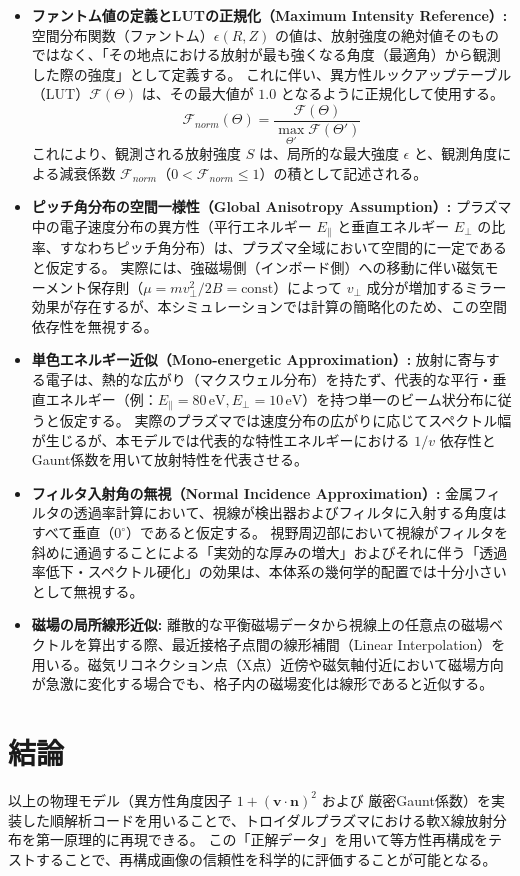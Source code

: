 \documentclass[a4paper,11pt]{bxjsarticle} %
\begin{document}
\begin{itemize}
    \item \textbf{ファントム値の定義とLUTの正規化（Maximum Intensity Reference）:}
    空間分布関数（ファントム）$\epsilon(R,Z)$ の値は、放射強度の絶対値そのものではなく、「その地点における放射が最も強くなる角度（最適角）から観測した際の強度」として定義する。
    これに伴い、異方性ルックアップテーブル（LUT）$\mathcal{F}(\Theta)$ は、その最大値が $1.0$ となるように正規化して使用する。
    \begin{equation}
        \mathcal{F}_{norm}(\Theta) = \frac{\mathcal{F}(\Theta)}{\max_{\Theta'} \mathcal{F}(\Theta')}
    \end{equation}
    これにより、観測される放射強度 $S$ は、局所的な最大強度 $\epsilon$ と、観測角度による減衰係数 $\mathcal{F}_{norm}$（$0 < \mathcal{F}_{norm} \le 1$）の積として記述される。
    
    \item \textbf{ピッチ角分布の空間一様性（Global Anisotropy Assumption）:}
    プラズマ中の電子速度分布の異方性（平行エネルギー $E_{\parallel}$ と垂直エネルギー $E_{\perp}$ の比率、すなわちピッチ角分布）は、プラズマ全域において空間的に一定であると仮定する。
    実際には、強磁場側（インボード側）への移動に伴い磁気モーメント保存則（$\mu = m v_{\perp}^2 / 2B = \text{const}$）によって $v_{\perp}$ 成分が増加するミラー効果が存在するが、本シミュレーションでは計算の簡略化のため、この空間依存性を無視する。
    
    \item \textbf{単色エネルギー近似（Mono-energetic Approximation）:}
    放射に寄与する電子は、熱的な広がり（マクスウェル分布）を持たず、代表的な平行・垂直エネルギー（例：$E_{\parallel}=80\,\text{eV}, E_{\perp}=10\,\text{eV}$）を持つ単一のビーム状分布に従うと仮定する。
    実際のプラズマでは速度分布の広がりに応じてスペクトル幅が生じるが、本モデルでは代表的な特性エネルギーにおける $1/v$ 依存性とGaunt係数を用いて放射特性を代表させる。
    
    \item \textbf{フィルタ入射角の無視（Normal Incidence Approximation）:}
    金属フィルタの透過率計算において、視線が検出器およびフィルタに入射する角度はすべて垂直（$0^{\circ}$）であると仮定する。
    視野周辺部において視線がフィルタを斜めに通過することによる「実効的な厚みの増大」およびそれに伴う「透過率低下・スペクトル硬化」の効果は、本体系の幾何学的配置では十分小さいとして無視する。
    
    \item \textbf{磁場の局所線形近似:}
    離散的な平衡磁場データから視線上の任意点の磁場ベクトルを算出する際、最近接格子点間の線形補間（Linear Interpolation）を用いる。磁気リコネクション点（X点）近傍や磁気軸付近において磁場方向が急激に変化する場合でも、格子内の磁場変化は線形であると近似する。
\end{itemize}

\section{結論}
以上の物理モデル（異方性角度因子 $1+(\bm{v}\cdot\bm{n})^2$ および 厳密Gaunt係数）を実装した順解析コードを用いることで、トロイダルプラズマにおける軟X線放射分布を第一原理的に再現できる。
この「正解データ」を用いて等方性再構成をテストすることで、再構成画像の信頼性を科学的に評価することが可能となる。
\end{document}
